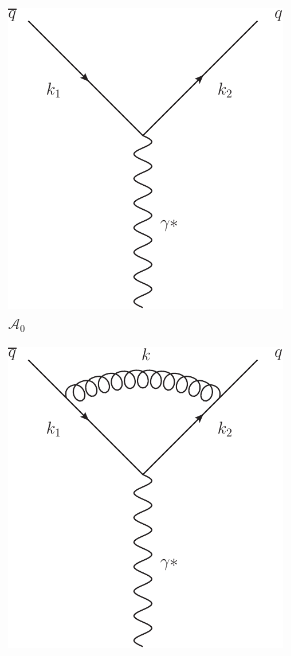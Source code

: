 		\begin{figure}[tpb]

			\centering

			\begin{subfigure}[b]{0.48\textwidth}
				\includegraphics[width=0.8\textwidth]{TreeLevel}
				\caption{$\mathcal{A}_0$}
				\label{fig:NLOfig_1}
			\end{subfigure}
			\begin{subfigure}[b]{0.48\textwidth}
				\includegraphics[width=0.8\textwidth]{NLOVirtual}

\end{subfigure}
\end{figure}
